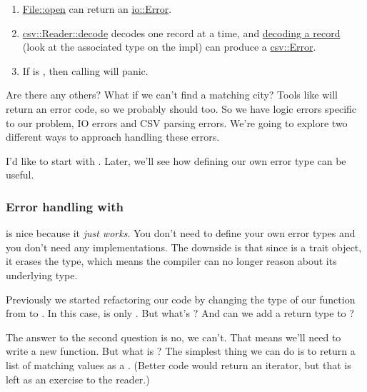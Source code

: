 \begin{enumerate}
  \item{\href{https://doc.rust-lang.org/std/fs/struct.File.html\#method.open}{File::open} can return an 
      \href{https://doc.rust-lang.org/std/io/struct.Error.html}{io::Error}.}
  \item{\href{http://burntsushi.net/rustdoc/csv/struct.Reader.html\#method.decode}{csv::Reader::decode} decodes one record at 
      a time, and \href{http://burntsushi.net/rustdoc/csv/struct.DecodedRecords.html}{decoding a record} (look at the 
       associated type on the  impl) can produce a 
      \href{http://burntsushi.net/rustdoc/csv/enum.Error.html}{csv::Error}.}
  \item{If  is \none, then calling  will panic.}
\end{enumerate}

Are there any others? What if we can't find a matching city? Tools like  will return an error code, so we 
probably should too. So we have logic errors specific to our problem, IO errors and CSV parsing errors. We're going to 
explore two different ways to approach handling these errors.

\blank

I'd like to start with . Later, we'll see how defining our own error type can be useful.

\subsubsection*{Error handling with }

 is nice because it \emph{just works}. You don't need to define your own error types and you don't need 
any  implementations. The downside is that since  is a trait object, it erases the type, which 
means the compiler can no longer reason about its underlying type.

\blank

Previously we started refactoring our code by changing the type of our function from  to 
. In this case,  is only . But what's ? And can we 
add a return type to ?

\blank

The answer to the second question is no, we can't. That means we'll need to write a new function. But what is ? 
The simplest thing we can do is to return a list of matching  values as a . (Better code would 
return an iterator, but that is left as an exercise to the reader.)

